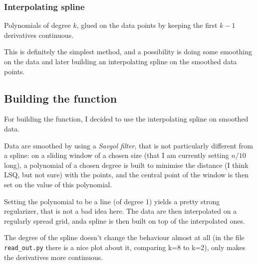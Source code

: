 \documentclass{article}
\begin{document}
\subsubsection{Interpolating spline}

Polynomials of degree \(k\), glued on the data points by keeping the first \(k-1\) derivatives continuous.

This is definitely the simplest method, and a possibility is doing some smoothing on the data and later building an interpolating spline on the smoothed data points.

\subsection{Building the function}

For building the function, I decided to use the interpolating spline on smoothed data.

Data are smoothed by using a \textit{Savgol filter}, that is not particularly different from a spline:
on a sliding window of a chosen size (that I am currently setting \(n/10\) long),
a polynomial of a chosen degree is built to minimise the distance (I think LSQ, but not sure) with the points,
and the central point of the window is then set on the value of this polynomial.

Setting the polynomial to be a line (of degree 1) yields a pretty strong regularizer,
that is not a bad idea here.
The data are then interpolated on a regularly spread grid,
anda spline is then built on top of the interpolated ones.

The degree of the spline doesn't change the behaviour almost at all (in the file \verb|read_out.py| there is a nice plot about it, comparing k=8 to k=2),
only makes the derivatives more continuous.
\end{document}
